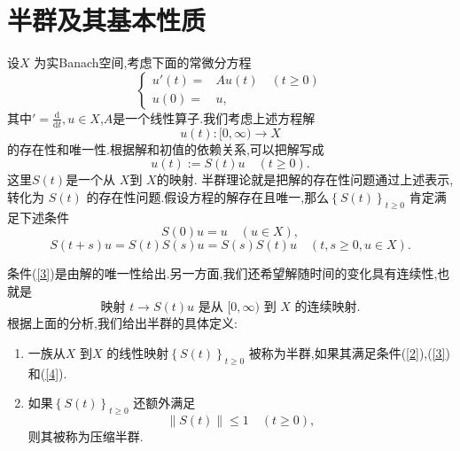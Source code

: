 
\begin{frame}[t]
  \tableofcontents
\end{frame}


\section{半群及其基本性质}
\begin{frame}[t]
  设$X$ 为实Banach空间,考虑下面的常微分方程
  \begin{equation}\label{1}
    \left\{
      \begin{aligned}
	{u}'(t)=&Au(t)\quad (t\ge 0)\\
	{u}(0)=&u,
      \end{aligned}
      \right.
  \end{equation}
  其中$'=\frac{\mathrm{d}}{\mathrm{d}t},u\in X$,$A$是一个线性算子.我们考虑上述方程解
  \[
    {u}(t):[0,\infty)\to X
  \] 的存在性和唯一性.根据解和初值的依赖关系,可以把解写成
\[
  {u}(t):=S(t)u\quad (t\ge 0).
\] 
这里$S(t)$是一个从 $X$到 $X$的映射.
半群理论就是把解的存在性问题通过上述表示,转化为 $S(t)$ 的存在性问题.假设方程的解存在且唯一,那么$\left\{S(t)\right\} _{t\ge 0}$ 肯定满足下述条件
\begin{equation}
  S(0)u=u\quad (u\in X),\label{2}
\end{equation}
\begin{equation}
  S(t+s)u=S(t)S(s)u=S(s)S(t)u \quad (t,s\ge 0, u\in X).\label{3}
\end{equation}
\end{frame}
\begin{frame}[t]
  条件(\ref{3})是由解的唯一性给出.另一方面,我们还希望解随时间的变化具有连续性,也就是
  \begin{equation}
    \text{映射 }t\to S(t)u \text{ 是从 }[0,\infty)\text{ 到 }X  \text{ 的连续映射}.\label{4}
  \end{equation}
  根据上面的分析,我们给出半群的具体定义:
  \begin{definition}
    \begin{enumerate}
      \item 一族从$X$ 到$X$ 的线性映射$\left\{S(t)\right\} _{t\ge 0}$ 被称为半群,如果其满足条件(\ref{2}),(\ref{3})和(\ref{4}).
      \item 如果$\left\{S(t)\right\} _{t\ge 0}$ 还额外满足
	\begin{equation}
	  \|S(t)\|\le 1\quad (t\ge 0),
	\end{equation}
	则其被称为压缩半群.
    \end{enumerate}
  \end{definition}
\end{frame}
